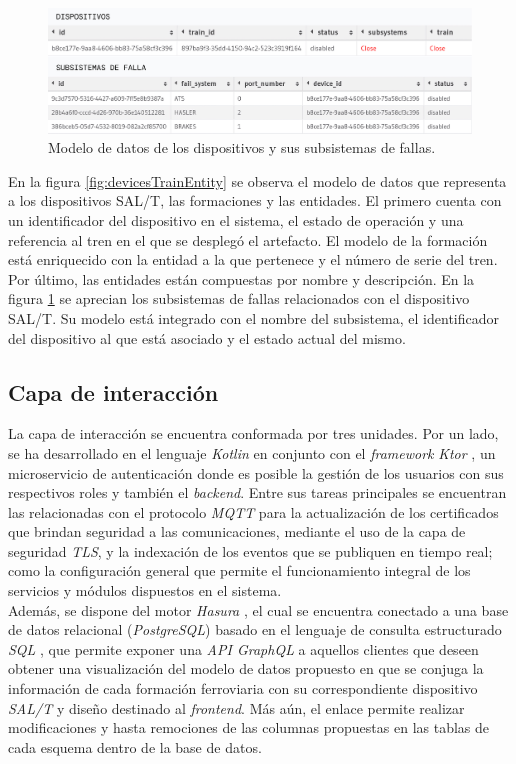 \begin{figure}[ht]
\centering 
\includegraphics[width=.5\textwidth]{images/v2.1.0/device_fail_system.jpg}
\caption{Modelo de datos de los dispositivos y sus subsistemas de fallas.}
\label{fig:devicesSubsystems}
\end{figure}

En la figura \ref{fig:devicesTrainEntity} se observa el modelo de datos que representa a los dispositivos SAL/T, las formaciones y las entidades. 
El primero cuenta con un identificador del dispositivo en el sistema, el estado de operación y una referencia al tren en el que se desplegó el artefacto. 
El modelo de la formación está enriquecido con la entidad a la que pertenece y el número de serie del tren. 
Por último, las entidades están compuestas por nombre y descripción.
En la figura \ref{fig:devicesSubsystems} se aprecian los subsistemas de fallas relacionados con el dispositivo SAL/T.
  Su modelo está integrado con el nombre del subsistema, el identificador del dispositivo al que está asociado y el estado actual del mismo. 

\subsection{Capa de interacción}

La capa de interacción se encuentra conformada por tres unidades. Por un lado, se ha desarrollado en el lenguaje \textit{Kotlin} \cite{b14} en conjunto con el \textit{framework} \textit{Ktor} \cite{b15}, un microservicio de autenticación donde es posible la gestión de los usuarios con sus respectivos roles y también el \textit{backend}. Entre sus tareas principales se encuentran las relacionadas con el protocolo \textit{MQTT} para la actualización de los certificados que brindan seguridad a las comunicaciones, mediante el uso de la capa de seguridad \textit{TLS}, y la indexación de los eventos que se publiquen en tiempo real; como la configuración general que permite el funcionamiento integral de los servicios y módulos dispuestos en el sistema. \\

Además, se dispone del motor \textit{Hasura} \cite{b16}, el cual se encuentra conectado a una base de datos relacional (\textit{PostgreSQL}) basado en el lenguaje de consulta estructurado \textit{SQL} \cite{b17}, que permite exponer una \textit{API GraphQL} \cite{b18} a aquellos clientes que deseen obtener una visualización del modelo de datos propuesto en que se conjuga la información de cada formación ferroviaria con su correspondiente dispositivo \textit{SAL/T} y diseño destinado al \textit{frontend}. Más aún, el enlace permite realizar modificaciones y hasta remociones de las columnas propuestas en las tablas de cada esquema dentro de la base de datos.


